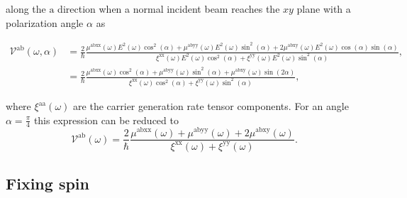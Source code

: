 \documentclass[prb,11pt,tightenlines,twocolumn,aps]{revtex4-1}
\begin{document}
along the $\mathrm{a}$ direction when a normal incident beam reaches the $xy$
plane with a polarization angle $\alpha$ as
\begin{widetext}
\begin{align}
\mathcal{V}^{\mathrm{ab}}(\omega,\alpha)
&= \frac{2}{\hbar}
\frac{\mu^{\mathrm{abxx}}(\omega)
E^{2}(\omega)\cos^{2}(\alpha) + 
\mu^{\mathrm{abyy}}(\omega)
E^{2}(\omega)\sin^{2}(\alpha) + 
2\mu^{\mathrm{abxy}}(\omega)
E^{2}(\omega)\cos(\alpha)\sin(\alpha)}
{\xi^{\mathrm{xx}}(\omega)
E^{2}(\omega)\cos^{2}(\alpha) + 
\xi^{\mathrm{yy}}(\omega)
E^{2}(\omega)\sin^{2}(\alpha)},
\nonumber \\
&= \frac{2}{\hbar}
\frac{\mu^{\mathrm{abxx}}(\omega)\cos^{2}(\alpha) + 
\mu^{\mathrm{abyy}}(\omega)\sin^{2}(\alpha) + 
\mu^{\mathrm{abxy}}(\omega)\sin(2\alpha)}
{\xi^{\mathrm{xx}}(\omega)\cos^{2}(\alpha) + 
\xi^{\mathrm{yy}}(\omega)\sin^{2}(\alpha)},
\label{eq:vab}
\end{align}
\end{widetext}
{\color{red}
where $\xi^{\mathrm{aa}}(\omega)$ are the carrier generation rate tensor
components\cite{arzatePRB14}.
}
% 
For an angle $\alpha = \frac{\pi}{4}$ this expression can be reduced to 
\begin{equation*}\label{eq:vab-90deg}
\mathcal{V}^{\mathrm{ab}} (\omega)
= \frac{2}{\hbar}
\frac{\mu^{\mathrm{abxx}}(\omega) + \mu^{\mathrm{abyy}}(\omega) + 
2\mu^{\mathrm{abxy}}(\omega)}
{\xi^{\mathrm{xx}}(\omega) + \xi^{\mathrm{yy}}(\omega)}.
\end{equation*}



\subsection{Fixing spin}\label{sec:theory-fixspin}
\end{document}
